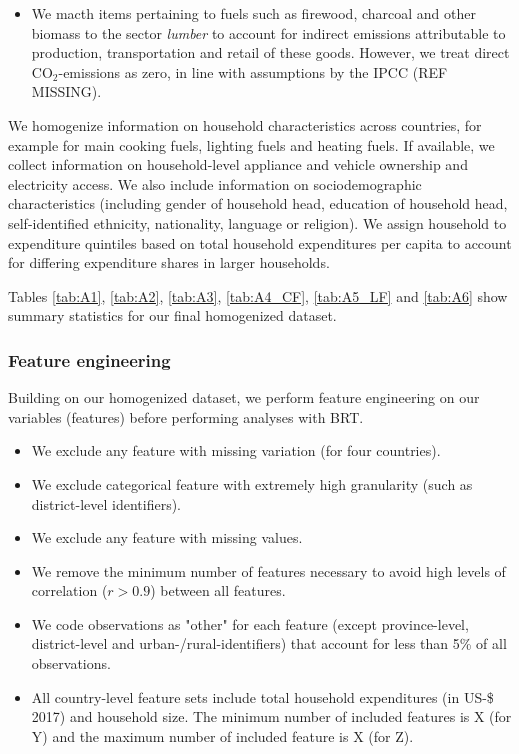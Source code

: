 \documentclass[12pt, a4paper]{article}
\begin{document}
\begin{itemize}
    \item We macth items pertaining to fuels such as firewood, charcoal and other biomass to the sector \textit{lumber} to account for indirect emissions attributable to production, transportation and retail of these goods. However, we treat direct CO$_{2}$-emissions as zero, in line with assumptions by the IPCC (REF MISSING).
\end{itemize}

We homogenize information on household characteristics across countries, for example for main cooking fuels, lighting fuels and heating fuels. If available, we collect information on household-level appliance and vehicle ownership and electricity access. We also include information on sociodemographic characteristics (including gender of household head, education of household head, self-identified ethnicity, nationality, language or religion).
We assign household to expenditure quintiles based on total household expenditures per capita to account for differing expenditure shares in larger households. 

Tables \ref{tab:A1}, \ref{tab:A2}, \ref{tab:A3}, \ref{tab:A4_CF}, \ref{tab:A5_LF} and \ref{tab:A6} show summary statistics for our final homogenized dataset. 


\subsubsection{Feature engineering} \label{sec:featureengineering}

Building on our homogenized dataset, we perform feature engineering on our variables (features) before performing analyses with BRT.

\begin{itemize}
    \item We exclude any feature with missing variation (for four countries).
    \item We exclude categorical feature with extremely high granularity (such as district-level identifiers).
    \item We exclude any feature with missing values.
    \item We remove the minimum number of features necessary to avoid high levels of correlation ($r>0.9$) between all features.
    \item We code observations as "other" for each feature (except province-level, district-level and urban-/rural-identifiers) that account for less than 5\% of all observations.
    \item All country-level feature sets include total household expenditures (in US-\$ 2017) and household size. The minimum number of included features is X (for Y) and the maximum number of included feature is X (for Z).
\end{itemize}
\end{document}
